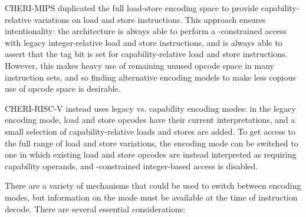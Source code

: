 CHERI-MIPS duplicated the full load-store encoding
space to provide capability-relative variations on load and store
instructions.
This approach ensures intentionality: the architecture is always able to
perform a \DDC{}-constrained access with legacy integer-relative load and store
instructions, and is always able to assert that the tag bit is set for
capability-relative load and store instructions.
However, this makes heavy use of remaining unused opcode space in many
instruction sets, and so finding alternative encoding models to make less
copious use of opcode space is desirable.

CHERI-RISC-V instead uses legacy vs.
capability encoding modes: in the legacy encoding mode, load and store opcodes
have their current interpretations, and a small selection of
capability-relative loads and stores are added.
To get access to the full range of load and store variations, the encoding
mode can be switched to one in which existing load and store opcodes are
instead interpreted as requiring capability operands, and \DDC{}-constrained
integer-based access is disabled.

There are a variety of mechanisms that could be used to switch between
encoding modes, but information on the mode must be available at the time
of instruction decode.
There are several essential considerations:

